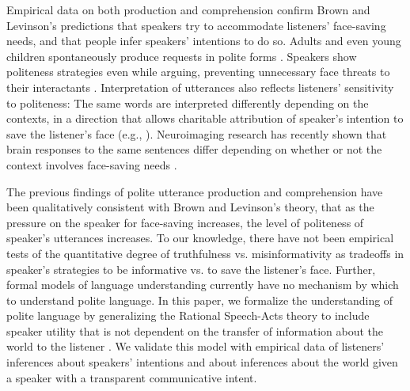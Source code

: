 \documentclass[10pt,letterpaper]{article}
\begin{document}
Empirical data on both production and comprehension confirm Brown and Levinson's predictions that speakers try to accommodate listeners' face-saving needs, and that people infer speakers' intentions to do so. Adults and even young children spontaneously produce requests in polite forms \cite{clark1980, axia1985}. Speakers show politeness strategies even while arguing, preventing unnecessary face threats to their interactants \cite{holtgraves1997}. Interpretation of utterances also reflects listeners' sensitivity to politeness: The same words are interpreted differently depending on the contexts, in a direction that allows charitable attribution of speaker's intention to save the listener's face (e.g., \cite{bonnefon2009}). Neuroimaging research has recently shown that brain responses to the same sentences differ depending on whether or not the context involves face-saving needs \cite{bavsnakova2014}.

The previous findings of polite utterance production and comprehension have been qualitatively consistent with Brown and Levinson's theory, that as the pressure on the speaker for face-saving increases, the level of politeness of speaker's utterances increases. 
To our knowledge, there have not been empirical tests of the quantitative degree of truthfulness vs. misinformativity as tradeoffs in speaker's strategies to be informative vs. to save the listener's face. 
Further, formal models of language understanding currently have no mechanism by which to understand polite language.
In this paper, we formalize the understanding of polite language by generalizing the Rational Speech-Acts theory to include speaker utility that is not dependent on the transfer of information about the world to the listener \cite{Frank2012, Goodman2013}.
We validate this model with empirical data of listeners' inferences about speakers' intentions and about inferences about the world given a speaker with a transparent communicative intent. 

%
\end{document}

